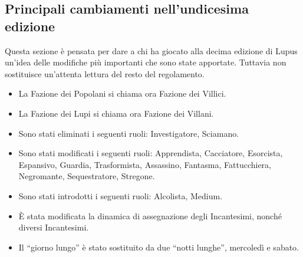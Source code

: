 \documentclass[a4paper,10pt]{article}
\begin{document}



\subsection{Principali cambiamenti nell'undicesima edizione}

Questa sezione è pensata per dare a chi ha giocato alla decima edizione di Lupus un'idea delle modifiche più importanti che sono state apportate. Tuttavia non sostituisce un'attenta lettura del resto del regolamento.

\begin{itemize}
	\item La Fazione dei Popolani si chiama ora Fazione dei Villici.
	\item La Fazione dei Lupi si chiama ora Fazione dei Villani.
	\item Sono stati eliminati i seguenti ruoli: Investigatore, Sciamano.
	\item Sono stati modificati i seguenti ruoli: Apprendista, Cacciatore, Esorcista, Espansivo, Guardia, Trasformista, Assassino, Fantasma, Fattucchiera, Negromante, Sequestratore, Stregone.
	\item Sono stati introdotti i seguenti ruoli: Alcolista, Medium.
	\item È stata modificata la dinamica di assegnazione degli Incantesimi, nonché diversi Incantesimi.
	\item Il ``giorno lungo'' è stato sostituito da due ``notti lunghe'', mercoledì e sabato.
\end{itemize}
\end{document}
